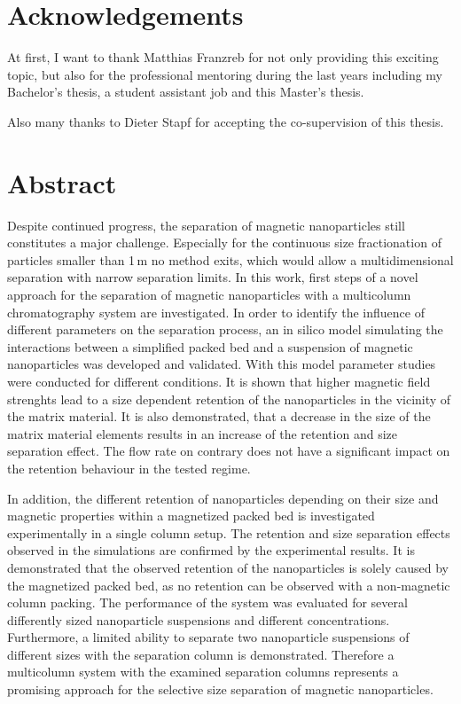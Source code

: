 \chapter{Acknowledgements}
\label{ch:Acknowledgements}

At first, I want to thank Matthias Franzreb for not only providing this exciting topic, but also for the professional mentoring during the last years including my Bachelor’s thesis, a student assistant job and this Master’s thesis.

Also many thanks to Dieter Stapf for accepting the co-supervision of this
thesis.

\newpage

\chapter{Abstract}
\label{ch:abstract_en}

Despite continued progress, the separation of magnetic nanoparticles still constitutes a major challenge. Especially for the continuous size fractionation of particles smaller than 1\,\textmu m no method exits, which would allow a multidimensional separation with narrow separation limits. In this work, first steps of a novel approach for the separation of magnetic nanoparticles with a multicolumn chromatography system are investigated. In order to identify the influence of different parameters on the separation process, an in silico model simulating the interactions between a simplified packed bed and a suspension of magnetic nanoparticles was developed and validated. With this model parameter studies were conducted for different conditions. It is shown that higher magnetic field strenghts lead to a size dependent retention of the nanoparticles in the vicinity of the matrix material. It is also demonstrated, that a decrease in the size of the matrix material elements results in an increase of the retention and size separation effect. The flow rate on contrary does not have a significant impact on the retention behaviour in the tested regime.  

In addition, the different retention of nanoparticles depending on their size and magnetic properties within a magnetized packed bed is investigated experimentally in a single column setup. The retention and size separation effects observed in the simulations are confirmed by the experimental results. It is demonstrated that the observed retention of the nanoparticles is solely caused by the magnetized packed bed, as no retention can be observed with a non-magnetic column packing. The performance of the system was evaluated for several differently sized nanoparticle suspensions and different concentrations. Furthermore, a limited ability to separate two nanoparticle suspensions of different sizes with the separation column is demonstrated. Therefore a multicolumn system with the examined separation columns represents a promising approach for the selective size separation of magnetic nanoparticles.

